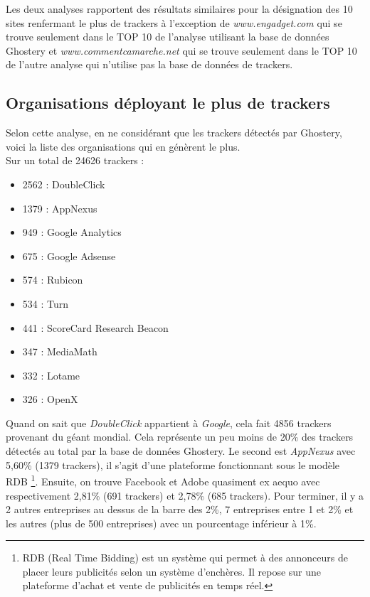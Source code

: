 Les deux analyses rapportent des résultats similaires pour la désignation des 10 sites renfermant le plus de trackers à l'exception de \textit{www.engadget.com} qui se trouve seulement dans le TOP 10 de l'analyse utilisant la base de données Ghostery et \textit{www.commentcamarche.net} qui se trouve seulement dans le TOP 10 de l'autre analyse qui n'utilise pas la base de données de trackers.

\subsection{Organisations déployant le plus de trackers}
Selon cette analyse, en ne considérant que les trackers détectés par Ghostery, voici la liste des organisations qui en génèrent le plus.\\
Sur un total de 24626 trackers :
\begin{multicols}{2}
\begin{itemize}
  \item 2562 : DoubleClick
  \item 1379 : AppNexus
  \item 949 : Google Analytics
  \item 675 : Google Adsense
  \item 574 : Rubicon
  \item 534 : Turn
  \item 441 : ScoreCard Research Beacon
  \item 347 : MediaMath
  \item 332 : Lotame
  \item 326 : OpenX
\end{itemize}
\end{multicols}

Quand on sait que \textit{DoubleClick} appartient à \textit{Google}, cela fait 4856 trackers provenant du géant mondial. Cela représente un peu moins de 20\% des trackers détectés au total par la base de données Ghostery. Le second est \textit{AppNexus} avec 5,60\% (1379 trackers), il s'agit d'une plateforme fonctionnant sous le modèle RDB \footnote{RDB (Real Time Bidding) est un système qui permet à des annonceurs de placer leurs publicités selon un système d'enchères. Il repose sur une plateforme d'achat et vente de publicités en temps réel.}. Ensuite, on trouve Facebook et Adobe quasiment ex aequo avec respectivement 2,81\% (691 trackers) et 2,78\% (685 trackers). Pour terminer, il y a 2 autres entreprises au dessus de la barre des 2\%, 7 entreprises entre 1 et 2\% et les autres (plus de 500 entreprises) avec un pourcentage inférieur à 1\%.
\newline

